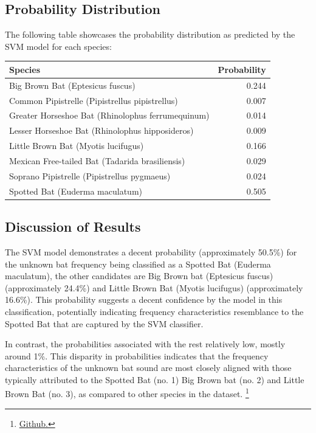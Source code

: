 \documentclass[twocolumn]{article}[ht]
\begin{document}
\subsection{Probability Distribution}
The following table showcases the probability distribution as predicted by the SVM model for each species:

\begin{center}
    \footnotesize
    \renewcommand{\arraystretch}{0.8}
    \begin{tabular}{lr}
    \toprule
    Species & Probability \\
    \midrule
    Big Brown Bat (Eptesicus fuscus) & 0.244 \\
    Common Pipistrelle (Pipistrellus pipistrellus) & 0.007 \\
    Greater Horseshoe Bat (Rhinolophus ferrumequinum) & 0.014 \\
    Lesser Horseshoe Bat (Rhinolophus hipposideros) & 0.009 \\
    Little Brown Bat (Myotis lucifugus) & 0.166 \\
    Mexican Free-tailed Bat (Tadarida brasiliensis) & 0.029 \\
    Soprano Pipistrelle (Pipistrellus pygmaeus) & 0.024 \\
    Spotted Bat (Euderma maculatum) & 0.505 \\
    \bottomrule
    \end{tabular}
\end{center}



\subsection{Discussion of Results}
The SVM model demonstrates a decent probability (approximately 50.5\%) for the unknown bat frequency being classified as a Spotted Bat (Euderma maculatum), the other candidates are Big Brown bat (Eptesicus fuscus) (approximately 24.4\%) and Little Brown Bat (Myotis lucifugus) (approximately 16.6\%). This probability suggests a decent confidence by the model in this classification, potentially indicating frequency characteristics resemblance to the Spotted Bat that are captured by the SVM classifier.

In contrast, the probabilities associated with the rest relatively low, mostly around 1\%. This disparity in probabilities indicates that the frequency characteristics of the unknown bat sound are most closely aligned with those typically attributed to the Spotted Bat (no. 1) Big Brown bat (no. 2) and Little Brown Bat (no. 3), as compared to other species in the dataset. \footnote{\href{https://github.com/hoang-nguyen13/Bat_Sound.git}{Github.}}
\end{document}
